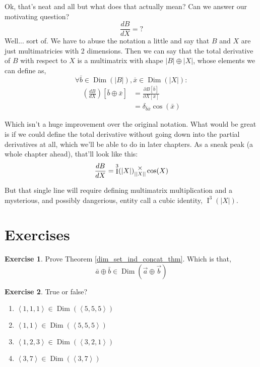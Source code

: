 \documentclass[12pt]{book}
\theoremstyle{plain}
\theoremstyle{definition}
\newtheorem{exercise}{Exercise}[chapter]
\theoremstyle{ppart}
\theoremstyle{case}
\theoremstyle{solution}
\DeclareMathOperator{\Dim}{Dim}
\DeclareMathOperator{\Ident}{I}
\newcommand{\mmult}[1]{\text{\raisebox{1ex}{$\underset{#1}{\times}$}}}
\newcommand{\shape}[1]{\left|#1\right|}
\begin{document}
Ok, that's neat and all but what does that actually mean? Can we answer our motivating 
question?
\[\frac{dB}{dX} = ? \]
Well... sort of. We have to abuse the notation a little and say that $B$ and $X$ are
just multimatricies with 2 dimensions. Then we can say that the total derivative
of $B$ with respect to $X$ is a multimatrix with shape $\shape{B} \oplus \shape{X}$,
whose elements we can define as,
\[\forall \bar{b} \in \Dim(\shape{B}), \bar{x} \in \Dim(\shape{X}):\]
\begin{align*}
\left( \frac{dB}{dX} \right)[\bar{b} \oplus \bar{x}]
&= \frac{\partial B[\bar{b}]}{\partial X[\bar{x}]} \\
&= \delta_{\bar{b}\bar{x}}\cos(\bar{x})
\end{align*}

Which isn't a huge improvement over the original notation. What would be great is
if we could define the total derivative without going down into the partial derivatives
at all, which we'll be able to do in later chapters. As a sneak peak (a whole
chapter ahead), that'll look like this:
\[
\frac{dB}{dX} = \Ident^3(\shape{X}) \mmult{\shape{\shape{X}}} \cos(X)
\]

But that single line will require defining multimatrix multiplication and
a mysterious, and possibly dangerious, entity call a cubic identity, $\Ident^3(\shape{X})$.

\section{Exercises}

\begin{exercise}
\label{dim_set_ind_concat_ex}
Prove Theorem \ref{dim_set_ind_concat_thm}. Which is that,
\[ \bar{a} \oplus \bar{b} \in \Dim(\vec{a} \oplus \vec{b}) \]
\end{exercise}

\begin{exercise}
True or false?
\begin{enumerate}
\item $\left<1,1,1\right> \in \Dim(\left<5,5,5\right>)$
\item $\left<1,1\right> \in \Dim(\left<5,5,5\right>)$
\item $\left<1,2,3\right> \in \Dim(\left<3,2,1\right>)$
\item $\left<3,7\right> \in \Dim(\left<3,7\right>)$
\end{enumerate}
\end{exercise}
\end{document}
